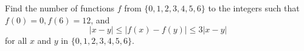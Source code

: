 Find the number of functions $f$ from $\{0,1,2,3,4,5,6\}$ to the integers such that $f(0)=0, f(6)=12$, and
\[|x-y| \le |f(x)-f(y)| \le 3 |x-y| \]for all $x$ and $y$ in $\{0,1,2,3,4,5,6\}$.